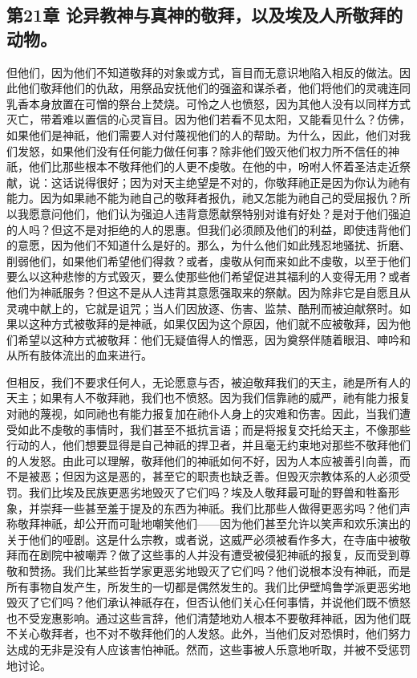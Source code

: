 
\subsection{第21章 论异教神与真神的敬拜，以及埃及人所敬拜的动物。}

但他们，因为他们不知道敬拜的对象或方式，盲目而无意识地陷入相反的做法。因此他们敬拜他们的仇敌，用祭品安抚他们的强盗和谋杀者，他们将他们的灵魂连同乳香本身放置在可憎的祭台上焚烧。可怜之人也愤怒，因为其他人没有以同样方式灭亡，带着难以置信的心灵盲目。因为他们若看不见太阳，又能看见什么？仿佛，如果他们是神祇，他们需要人对付蔑视他们的人的帮助。为什么，因此，他们对我们发怒，如果他们没有任何能力做任何事？除非他们毁灭他们权力所不信任的神祇，他们比那些根本不敬拜他们的人更不虔敬。在他的中，吩咐人怀着圣洁走近祭献，说：这话说得很好；因为对天主绝望是不对的，你敬拜祂正是因为你认为祂有能力。因为如果祂不能为祂自己的敬拜者报仇，祂又怎能为祂自己的受屈报仇？所以我愿意问他们，他们认为强迫人违背意愿献祭特别对谁有好处？是对于他们强迫的人吗？但这不是对拒绝的人的恩惠。但我们必须顾及他们的利益，即使违背他们的意愿，因为他们不知道什么是好的。那么，为什么他们如此残忍地骚扰、折磨、削弱他们，如果他们希望他们得救？或者，虔敬从何而来如此不虔敬，以至于他们要么以这种悲惨的方式毁灭，要么使那些他们希望促进其福利的人变得无用？或者他们为神祇服务？但这不是从人违背其意愿强取来的祭献。因为除非它是自愿且从灵魂中献上的，它就是诅咒；当人们因放逐、伤害、监禁、酷刑而被迫献祭时。如果以这种方式被敬拜的是神祇，如果仅因为这个原因，他们就不应被敬拜，因为他们希望以这种方式被敬拜：他们无疑值得人的憎恶，因为奠祭伴随着眼泪、呻吟和从所有肢体流出的血来进行。\par

但相反，我们不要求任何人，无论愿意与否，被迫敬拜我们的天主，祂是所有人的天主；如果有人不敬拜祂，我们也不愤怒。因为我们信靠祂的威严，祂有能力报复对祂的蔑视，如同祂也有能力报复加在祂仆人身上的灾难和伤害。因此，当我们遭受如此不虔敬的事情时，我们甚至不抵抗言语；而是将报复交托给天主，不像那些行动的人，他们想要显得是自己神祇的捍卫者，并且毫无约束地对那些不敬拜他们的人发怒。由此可以理解，敬拜他们的神祇如何不好，因为人本应被善引向善，而不是被恶；但因为这是恶的，甚至它的职责也缺乏善。但毁灭宗教体系的人必须受罚。我们比埃及民族更恶劣地毁灭了它们吗？埃及人敬拜最可耻的野兽和牲畜形象，并崇拜一些甚至羞于提及的东西为神祇。我们比那些人做得更恶劣吗？他们声称敬拜神祇，却公开而可耻地嘲笑他们——因为他们甚至允许以笑声和欢乐演出的关于他们的哑剧。这是什么宗教，或者说，这威严必须被看作多大，在寺庙中被敬拜而在剧院中被嘲弄？做了这些事的人并没有遭受被侵犯神祇的报复，反而受到尊敬和赞扬。我们比某些哲学家更恶劣地毁灭了它们吗？他们说根本没有神祇，而是所有事物自发产生，所发生的一切都是偶然发生的。我们比伊壁鸠鲁学派更恶劣地毁灭了它们吗？他们承认神祇存在，但否认他们关心任何事情，并说他们既不愤怒也不受宠惠影响。通过这些言辞，他们清楚地劝人根本不要敬拜神祇，因为他们既不关心敬拜者，也不对不敬拜他们的人发怒。此外，当他们反对恐惧时，他们努力达成的无非是没有人应该害怕神祇。然而，这些事被人乐意地听取，并被不受惩罚地讨论。\par

